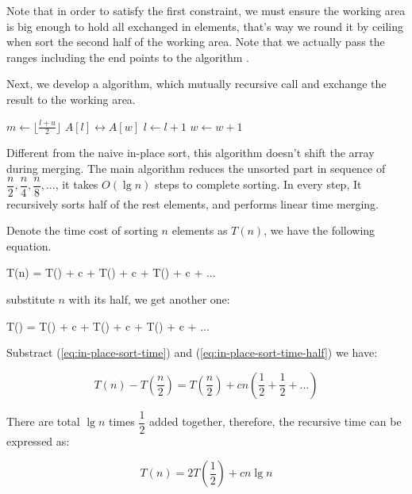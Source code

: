 \documentclass[b5paper]{article}
\begin{document}
Note that in order to satisfy the first constraint, we must ensure the working area is big enough to hold
all exchanged in elements, that's way we round it by ceiling when sort the second half of the working area.
Note that we actually pass the ranges including the end points to the algorithm .

Next, we develop a  algorithm, which mutually recursive call  and exchange the result
to the working area.

\begin{algorithmic}[1]
    \State $m \gets \lfloor \frac{l + u}{2} \rfloor$
    \State {}
    \State {}
    \State {}
  \Else {}
      \State {} $A[l] \leftrightarrow A[w]$
      \State $l \gets l + 1$
      \State $w \gets w + 1$
    \EndWhile
  \EndIf
\EndProcedure
\end{algorithmic}

Different from the naive in-place sort, this algorithm doesn't shift the array during merging. The main
algorithm reduces the unsorted part in sequence of $\dfrac{n}{2}, \dfrac{n}{4}, \dfrac{n}{8}, ...$, it takes $O(\lg n)$ steps to complete
sorting. In every step, It recursively sorts half of the rest elements, and performs linear time merging.

Denote the time cost of sorting $n$ elements as $T(n)$, we have the following equation.

\be
T(n) = T() + c  + T() + c  + T() + c  + ...
\label{eq:in-place-sort-time}
\ee

substitute $n$ with its half, we get another one:

\be
T() = T() + c  + T() + c  + T() + c  + ...
\label{eq:in-place-sort-time-half}
\ee

Substract (\ref{eq:in-place-sort-time}) and (\ref{eq:in-place-sort-time-half}) we have:

\[
T(n) - T(\frac{n}{2}) = T(\frac{n}{2}) + c n (\frac{1}{2} + \frac{1}{2} + ... )
\]

There are total $\lg n$ times $\dfrac{1}{2}$ added together, therefore, the recursive time can be expressed as:

\[
T(n) = 2 T(\frac{1}{2}) + c n \lg n
\]
\end{document}
